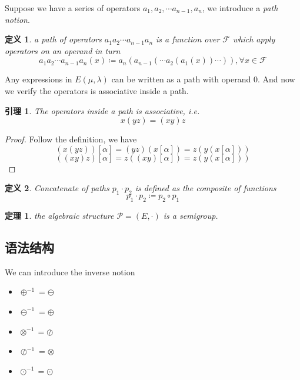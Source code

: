 \documentclass[a4paper,12pt]{article}
\newtheorem{definition}{定义}
\numberwithin{definition}{section}
\newtheorem{lemma}{引理}
\numberwithin{lemma}{section}
\numberwithin{proposition}{section}
\newtheorem{theorem}{定理}
\numberwithin{theorem}{section}
\numberwithin{grammar}{section}
\numberwithin{program}{section}
\numberwithin{convention}{section}
\numberwithin{corollary}{section}
\begin{document}
Suppose we have a series of operators $a_1, a_2, \cdots a_{n-1}, a_n$, we introduce a \emph{path notion}.

\begin{definition}
\label{definition:path}
    a path of operators $a_1 a_2 \cdots a_{n-1} a_n$ is a function over $\mathcal{F}$ which apply operators on an operand in turn
    $$a_1 a_2 \cdots a_{n-1} a_n (x) \coloneqq a_n( a_{n-1}( \cdots a_2( a_1(x) ) \cdots ) ), \forall x \in \mathcal{F}$$
\end{definition}

Any expressions in $E(\mu, \lambda)$ can be written as a path with operand $0$. And now we verify the operators is associative inside a path.

\begin{lemma}
\label{lemma:associative}
    The operators inside a path is associative, i.e. $$x (y z) = (x y) z$$
\end{lemma}

\begin{proof}
    Follow the definition, we have
$$(x (y z)) [\alpha] = (y z) (x[\alpha]) = z(y(x[\alpha]))$$
$$((x y) z) [\alpha] = z ((x y)[\alpha]) = z(y(x[\alpha]))$$
\qedhere
\end{proof}

\begin{definition}
\label{definition:concatenate}
    Concatenate of paths $p_1 \cdot p_2$ is defined as the composite of functions
    $$p_1 \cdot p_2 \coloneqq p_2 \circ p_1 $$
\end{definition}

\begin{theorem}
\label{theorem:semigroup}
the algebraic structure $\mathcal{P} = (E, \cdot)$ is a semigroup.
\end{theorem}

\subsection{语法结构}\label{subsec:syntactical}

We can introduce the inverse notion
\begin{itemize}
    \item $\oplus^{-1} = \ominus$
    \item $\ominus^{-1} = \oplus$
    \item $\otimes^{-1} = \oslash$
    \item $\oslash^{-1} = \otimes$
    \item $\odot^{-1} = \odot$
\end{itemize}
\end{document}
